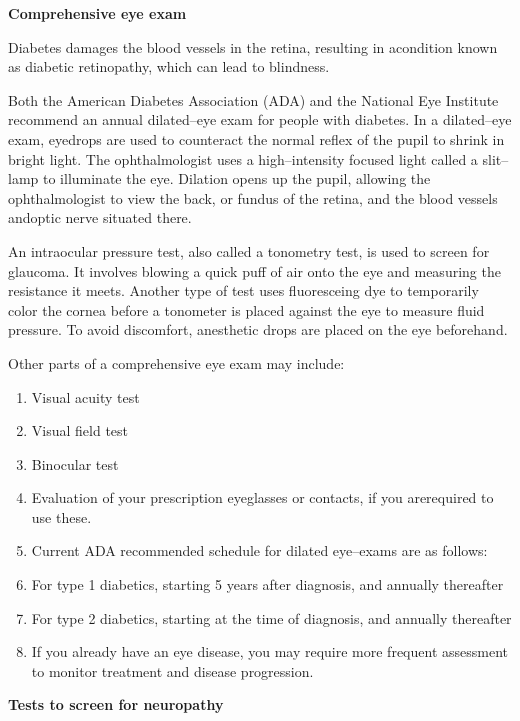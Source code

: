 \noindent\textbf{Comprehensive eye exam}

Diabetes damages the blood vessels in the retina, resulting in a\break condition known as diabetic retinopathy, which can lead to blindness.

Both the American Diabetes Association (ADA) and the National Eye Institute recommend an annual dilated–eye exam for people with diabetes. In a dilated–eye exam, eyedrops are used to counteract the normal reflex of the pupil to shrink in bright light. The ophthalmo\-logist uses a high–intensity focused light called a slit–lamp to illuminate the eye. Dilation opens up the pupil, allowing the ophthalmo\-logist to view the back, or fundus of the retina, and the blood vessels and\break optic nerve situated there.

An intraocular pressure test, also called a tonometry test, is used to screen for glaucoma. It involves blowing a quick puff of air onto the eye and measuring the resistance it meets. Another type of test uses fluoresceing dye to temporarily color the cornea before a tonometer is placed against the eye to measure fluid pressure. To avoid discomfort, anesthetic drops are placed on the eye beforehand.

\noindent Other parts of a comprehensive eye exam may include:

\vspace{-\topsep}
\begin{enumerate}[•]
\itemsep=0pt
\item Visual acuity test
\item Visual field test
\item Binocular test
\item Evaluation of your prescription eyeglasses or contacts, if you are\break required to use these.
\item Current ADA recommended schedule for dilated eye–exams are as follows:
\item For type 1 diabetics, starting 5 years after diagnosis, and annually thereafter
\item For type 2 diabetics, starting at the time of diagnosis, and annually thereafter
\item If you already have an eye disease, you may require more frequent assessment to monitor treatment and disease progression.
\end{enumerate}
\vspace{-\topsep}

\noindent\textbf{Tests to screen for neuropathy}

